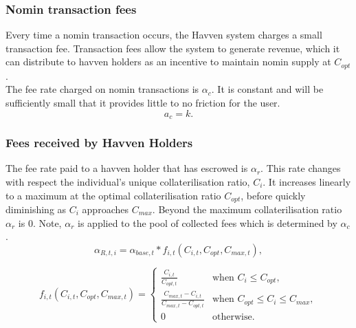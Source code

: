 \subsubsection{Nomin transaction fees} Every time a nomin transaction occurs, the Havven system charges a small transaction fee. Transaction fees allow the system to generate revenue, which it can distribute to havven holders as an incentive to maintain nomin supply at $C_{opt}$. \\

\noindent The fee rate charged on nomin transactions is $\alpha_c$. It is constant and will be sufficiently small that it provides little to no friction for the user.\\

$$ a_c = k.$$ 

\begin{center}
\end{center}

\newpage
\subsubsection{Fees received by Havven Holders}

\noindent The fee rate paid to a havven holder that has escrowed is $\alpha_r$. This rate changes with respect the individual's unique collaterilisation ratio, $C_i$. It increases linearly to a maximum at the optimal collaterilisation ratio $C_{opt}$, before quickly diminishing as $C_i$ approaches $C_{max}$. Beyond the maximum collaterilisation ratio $\alpha_r$ is 0. Note, $\alpha_r$ is applied to the pool of collected fees which is determined by $\alpha_c$. \\

$$ \alpha_{R,t,i} = \alpha_{base,t} * f_{i,t}(C_{i,t}, C_{opt}, C_{max,t}), $$

\[
f_{i,t}(C_{i,t}, C_{opt}, C_{max,t}) = 
\begin{cases}
 \frac{C_{i,t}}{C_{opt,t}} &\mbox{when } C_i \leq C_{opt}, \\[1em]
 \frac{C_{max,t} - C_{i,t}}{C_{max,t} - C_{opt,t}} &\mbox{when } C_{opt} \leq C_i \leq C_{max}, \\[1em]
 0 &\mbox{otherwise}.
 \end{cases}
\]

